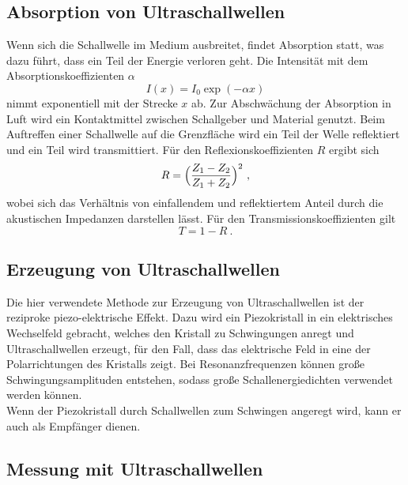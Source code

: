 \subsection{Absorption von Ultraschallwellen}

    Wenn sich die Schallwelle im Medium ausbreitet,
    findet Absorption statt,
    was dazu führt,
    dass ein Teil der Energie verloren geht.
    Die Intensität mit dem Absorptionskoeffizienten $\alpha$
    \begin{equation}
        I(x) = I_0 \exp{(-\alpha x)}
    \end{equation}
    nimmt exponentiell mit der Strecke $x$ ab.
    Zur Abschwächung der Absorption in Luft wird ein Kontaktmittel zwischen Schallgeber und Material genutzt.
    Beim Auftreffen einer Schallwelle auf die Grenzfläche wird ein Teil der Welle reflektiert und ein Teil wird transmittiert.
    Für den Reflexionskoeffizienten $R$ ergibt sich
    \begin{equation}
        R = \Bigl(\frac{Z_1 - Z_2}{Z_1 + Z_2}\Bigr)^2 \ ,
        \label{eqn:reflexion}
    \end{equation}
    wobei sich das Verhältnis von einfallendem und reflektiertem Anteil durch die akustischen Impedanzen darstellen lässt.
    Für den Transmissionskoeffizienten gilt
    \begin{equation}
        T = 1 - R \ .
        \label{eqn:transmission}
    \end{equation}

\subsection{Erzeugung von Ultraschallwellen}

    Die hier verwendete Methode zur Erzeugung von Ultraschallwellen ist der reziproke piezo-elektrische Effekt.
    Dazu wird ein Piezokristall in ein elektrisches Wechselfeld gebracht,
    welches den Kristall zu Schwingungen anregt und Ultraschallwellen erzeugt,
    für den Fall,
    dass das elektrische Feld in eine der Polarrichtungen des Kristalls zeigt.
    Bei Resonanzfrequenzen können große Schwingungsamplituden entstehen,
    sodass große Schallenergiedichten verwendet werden können.\\
    Wenn der Piezokristall durch Schallwellen zum Schwingen angeregt wird, 
    kann er auch als Empfänger dienen.

\subsection{Messung mit Ultraschallwellen}

